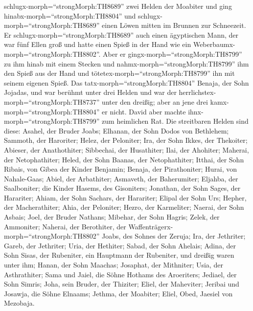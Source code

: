 schlugx-morph=``strongMorph:TH8689'' zwei Helden der Moabiter und ging
hinabx-morph=``strongMorph:TH8804'' und
schlugx-morph=``strongMorph:TH8689'' einen Löwen mitten im Brunnen zur
Schneezeit.  Er schlugx-morph=``strongMorph:TH8689'' auch
einen ägyptischen Mann, der war fünf Ellen groß und hatte einen Spieß in
der Hand wie ein Weberbaumx-morph=``strongMorph:TH8802''. Aber er
gingx-morph=``strongMorph:TH8799'' zu ihm hinab mit einem Stecken und
nahmx-morph=``strongMorph:TH8799'' ihm den Spieß aus der Hand und
tötetex-morph=``strongMorph:TH8799'' ihn mit seinem eigenen Spieß.
 Das tatx-morph=``strongMorph:TH8804'' Benaja, der Sohn
Jojadas, und war berühmt unter drei Helden  und war der
herrlichstex-morph=``strongMorph:TH8737'' unter den dreißig; aber an
jene drei kamx-morph=``strongMorph:TH8804'' er nicht. David aber machte
ihnx-morph=``strongMorph:TH8799'' zum heimlichen Rat.  Die
streitbaren Helden sind diese: Asahel, der Bruder Joabs; Elhanan, der
Sohn Dodos von Bethlehem;  Sammoth, der Haroriter; Helez,
der Peloniter;  Ira, der Sohn Ikkes, der Thekoiter;
Abieser, der Anathothiter;  Sibbechai, der Husathiter;
Ilai, der Ahohiter;  Maherai, der Netophathiter; Heled, der
Sohn Baanas, der Netophathiter;  Itthai, der Sohn Ribais,
von Gibea der Kinder Benjamin; Benaja, der Pirathoniter; 
Hurai, von Nahale-Gaas; Abiel, der Arbathiter;  Asmaveth,
der Baherumiter; Eljahba, der Saalboniter;  die Kinder
Hasems, des Gisoniters; Jonathan, der Sohn Sages, der Harariter;
 Ahiam, der Sohn Sachars, der Harariter; Elipal der Sohn
Urs;  Hepher, der Macherathiter; Ahia, der Peloniter;
 Hezro, der Karmeliter; Naerai, der Sohn Asbais;
 Joel, der Bruder Nathans; Mibehar, der Sohn Hagris;
 Zelek, der Ammoniter; Naherai, der Berothiter, der
Waffenträgerx-morph=``strongMorph:TH8802'' Joabs, des Sohnes der Zeruja;
 Ira, der Jethriter; Gareb, der Jethriter; 
Uria, der Hethiter; Sabad, der Sohn Ahelais;  Adina, der
Sohn Sisas, der Rubeniter, ein Hauptmann der Rubeniter, und dreißig
waren unter ihm;  Hanan, der Sohn Maachas; Josaphat, der
Mithniter;  Usia, der Asthrathiter; Sama und Jaiel, die
Söhne Hothams des Aroeriters;  Jediael, der Sohn Simris;
Joha, sein Bruder, der Thiziter;  Eliel, der Maheviter;
Jeribai und Josawja, die Söhne Elnaams; Jethma, der Moabiter;
 Eliel, Obed, Jaesiel von Mezobaja.

